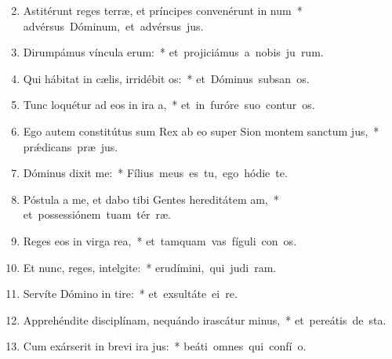 \begin{flushleft}
\begin{enumerate}[leftmargin=*]
\setcounter{enumi}{1}

\item Astitérunt reges terræ, et príncipes convenérunt in num~* \mbox{advérsus Dóminum, et advérsus  jus.}
\item Dirumpámus víncula erum:~* \mbox{et projiciámus a nobis ju rum.}
\item Qui hábitat in cælis, irridébit os:~* \mbox{et Dóminus subsan os.}
\item Tunc loquétur ad eos in ira a,~* \mbox{et in furóre suo contur os.}
\item Ego autem constitútus sum Rex ab eo super Sion montem sanctum jus,~* \mbox{pr\'{\ae}dicans præ jus.}
\item Dóminus dixit  me:~* \mbox{Fílius meus es tu, ego hódie  te.}
\item Póstula a me, et dabo tibi Gentes hereditátem am,~* \mbox{et possessiónem tuam tér ræ.}
\item Reges eos in virga rea,~* \mbox{et tamquam vas fíguli con os.}
\item Et nunc, reges, intelgite:~* \mbox{erudímini, qui judi ram.}
\item Servíte Dómino in tire:~* \mbox{et exsultáte ei  re.}
\item Apprehéndite disciplínam, nequándo irascátur minus,~* \mbox{et pereátis de  sta.}
\item Cum exárserit in brevi ira jus:~* \mbox{beáti omnes qui confí  o.}

\end{enumerate}
\end{flushleft}

